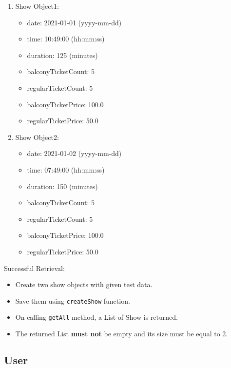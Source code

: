 \documentclass[]{article}
\providecommand{\tightlist}{%
  \setlength{\itemsep}{0pt}\setlength{\parskip}{0pt}}
\begin{document}
\begin{enumerate}
\def\labelenumi{\arabic{enumi}.}
\tightlist
\item
  Show Object1:

  \begin{itemize}
  \tightlist
  \item
    date: 2021-01-01 (yyyy-mm-dd)
  \item
    time: 10:49:00 (hh:mm:ss)
  \item
    duration: 125 (minutes)
  \item
    balconyTicketCount: 5
  \item
    regularTicketCount: 5
  \item
    balconyTicketPrice: 100.0
  \item
    regularTicketPrice: 50.0
  \end{itemize}
\item
  Show Object2:

  \begin{itemize}
  \tightlist
  \item
    date: 2021-01-02 (yyyy-mm-dd)
  \item
    time: 07:49:00 (hh:mm:ss)
  \item
    duration: 150 (minutes)
  \item
    balconyTicketCount: 5
  \item
    regularTicketCount: 5
  \item
    balconyTicketPrice: 100.0
  \item
    regularTicketPrice: 50.0
  \end{itemize}
\end{enumerate}

Successful Retrieval:

\begin{itemize}
\tightlist
\item
  Create two show objects with given test data.
\item
  Save them using \texttt{createShow} function.
\item
  On calling \texttt{getAll} method, a List of Show is returned.
\item
  The returned List \textbf{must not} be empty and its size must be
  equal to 2.
\end{itemize}

\hypertarget{user}{%
\subsection{User}\label{user}}
\end{document}
